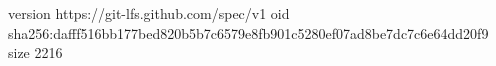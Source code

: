 version https://git-lfs.github.com/spec/v1
oid sha256:dafff516bb177bed820b5b7c6579e8fb901c5280ef07ad8be7dc7c6e64dd20f9
size 2216
